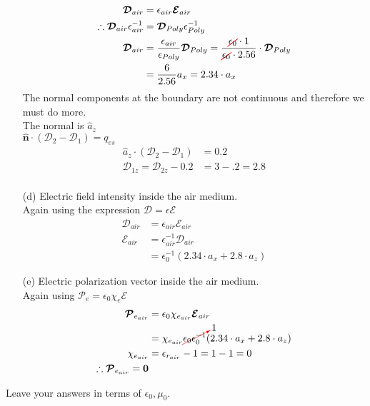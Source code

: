 \documentclass[12pt]{article}
\begin{document}
\begin{itemize}
\begin{align*}
    \bm{\mathcal{D}}_{air} &= \epsilon_{air}\bm{\mathcal{E}}_{air}\\
    \therefore \bm{\mathcal{D}}_{air}\epsilon_{air}^{-1} &=  \bm{\mathcal{D}}_{Poly}\epsilon_{Poly }^{-1}\\
    \bm{\mathcal{D}}_{air} &= \frac{\epsilon_{air}}{\epsilon_{Poly}}\bm{\mathcal{D}}_{Poly} = \frac{\textcolor{red}{\cancel{\textcolor{black}{\epsilon_0}}}\cdot 1}{\textcolor{red}{\cancel{\textcolor{black}{\epsilon_0}}}\cdot 2.56}\cdot \bm{\mathcal{D}}_{Poly}\\
    &= \frac{6}{2.56}a_x  = 2.34\cdot a_x   
  \end{align*}
  The normal components at the boundary are not continuous and therefore we must do more.\\
  The normal is $\hat a_z$\\
  $\mathbf{\hat n}\cdot (\bm{\mathcal{D}}_2 - \bm{\mathcal{D}}_1) = q_{es}$\\
  \begin{align*}
    \hat a_z\cdot (\bm{\mathcal{D}}_2 - \bm{\mathcal{D}}_1) &= 0.2 \\
     \bm{\mathcal{D}}_{1z} = \bm{\mathcal{D}}_{2z} - 0.2 &= 3-.2 = 2.8\\
  \end{align*}
\item[(d)] Electric field intensity inside the air medium.\\ 
  Again using the expression $\bm{\mathcal{D}} = \epsilon \bm{\mathcal{E}}$
  \begin{align*}
    \bm{\mathcal{D}}_{air} &= \epsilon_{air} \bm{\mathcal{E}}_{air} \\
    \bm{\mathcal{E}}_{air} &= \epsilon_{air}^{-1}\bm{\mathcal{D}}_{air}\\
    &= \epsilon_0^{-1}(2.34\cdot a_x + 2.8\cdot a_z)
  \end{align*}
\item[(e)] Electric polarization vector inside the air medium.\\ 
  Again using $\bm{\mathcal{P}}_e = \epsilon_0\chi_e\bm{\mathcal{E}}$\\
  \begin{align*}
    \bm{\mathcal{P}}_{e_{air}} &= \epsilon_0\chi_{e_{air}}\bm{\mathcal{E}}_{air}\\
                         &= \chi_{e_{air}}\textcolor{red}{\cancelto{\textcolor{black}{1}}{\textcolor{black}{\epsilon_0\epsilon_0^{-1}}}}(2.34\cdot a_x + 2.8\cdot a_z)\\
    \chi_{e_{air}} &= \epsilon_{r_{air}} - 1 = 1-1=0\\
    \therefore \bm{\mathcal{P}}_{e_{air}} = \mathbf{0}
  \end{align*}
\end{itemize}
Leave your answers in terms of \( \epsilon_0, \mu_0 \).
\end{document}
